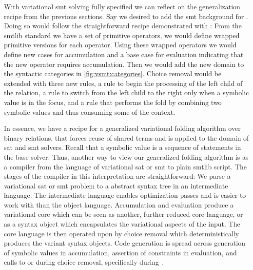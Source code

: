 \label{section:vsmt:arrays}
%
With variational \ac{smt} solving fully specified we can reflect on the
generalization recipe from the previous sections. Say we desired to add the
\ac{smt} background for . Doing so would follow the straightforward
recipe demonstrated with : From the \acl{smtlib} standard we have a set
of primitive operators, we would define wrapped primitive versions for each
operator. Using these wrapped operators we would define new cases for
accumulation and a base case for evaluation indicating that the new operator
requires accumulation. Then we would add the new domain to the syntactic
categories in \autoref{fig:vsmt:categories}. Choice removal would be extended
with three new rules, a rule to begin the processing of the left child of the
relation, a rule to switch from the left child to the right only when a symbolic
value is in the focus, and a rule that performs the fold by combining two
symbolic values and thus consuming some of the context.

In essence, we have a recipe for a generalized variational folding algorithm
over binary relations, that forces reuse of shared terms and is applied to the
domain of \ac{sat} and \ac{smt} solvers. Recall that a symbolic value is a
sequence of statements in the base solver. Thus, another way to view our
generalized folding algorithm is as a compiler from the language of variational
\ac{sat} or \ac{smt} to plain \acl{smtlib} script. The stages of the compiler in
this interpretation are straightforward: We parse a variational \ac{sat} or
\ac{smt} problem to a abstract syntax tree in an intermediate language. The
intermediate language enables optimization passes and is easier to work with
than the object language. Accumulation and evaluation produce a variational core
which can be seen as another, further reduced core language, or as a syntax
object which encapsulates the variational aspects of the input. The core
language is then operated upon by choice removal which deterministically
produces the variant syntax objects. Code generation is spread across generation
of symbolic values in accumulation, assertion of constraints in evaluation, and
calls to  or  during choice removal, specifically during
\crChc.

